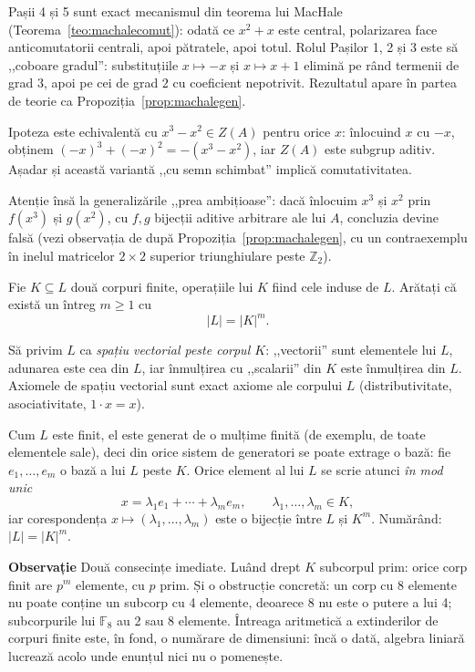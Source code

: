 \begin{obs}
Pașii 4 și 5 sunt exact mecanismul din teorema lui MacHale
(Teorema~\ref{teo:machalecomut}): odată ce $x^{2}+x$ este central,
polarizarea face anticomutatorii centrali, apoi pătratele, apoi
totul. Rolul Pașilor 1, 2 și 3 este să ,,coboare gradul'': substituțiile
$x\mapsto -x$ și $x\mapsto x+1$ elimină pe rând termenii de grad $3$,
apoi pe cei de grad $2$ cu coeficient nepotrivit. Rezultatul apare în
partea de teorie ca Propoziția~\ref{prop:machalegen}.

Ipoteza este echivalentă cu $x^{3}-x^{2}\in Z(A)$ pentru orice $x$:
înlocuind $x$ cu $-x$, obținem $(-x)^{3}+(-x)^{2}=-(x^{3}-x^{2})$, iar
$Z(A)$ este subgrup aditiv. Așadar și această variantă ,,cu semn
schimbat'' implică comutativitatea.

Atenție însă la generalizările ,,prea ambițioase'': dacă înlocuim
$x^{3}$ și $x^{2}$ prin $f(x^{3})$ și $g(x^{2})$, cu $f,g$ bijecții
aditive arbitrare ale lui $A$, concluzia devine falsă (vezi
observația de după Propoziția~\ref{prop:machalegen}, cu un
contraexemplu în inelul matricelor $2\times 2$ superior triunghiulare
peste $\mathbb{Z}_{2}$).
\end{obs}


\begin{problema}[Clasică]
Fie $K \subseteq L$ două corpuri finite, operațiile lui $K$ fiind cele induse de $L$. Arătați că există un întreg $m \geq 1$ cu
\[
  |L| = |K|^m.
\]
\end{problema}

\begin{solutie}
Să privim $L$ ca \emph{spațiu vectorial peste corpul $K$}: ,,vectorii'' sunt elementele lui $L$, adunarea este cea din $L$, iar înmulțirea cu ,,scalarii'' din $K$ este înmulțirea din $L$. Axiomele de spațiu vectorial sunt exact axiome ale corpului $L$ (distributivitate, asociativitate, $1 \cdot x = x$).

Cum $L$ este finit, el este generat de o mulțime finită (de exemplu, de toate elementele sale), deci din orice sistem de generatori se poate extrage o bază: fie $e_1, \dots, e_m$ o bază a lui $L$ peste $K$. Orice element al lui $L$ se scrie atunci \emph{în mod unic}
\[
  x = \lambda_1 e_1 + \cdots + \lambda_m e_m, \qquad \lambda_1, \dots, \lambda_m \in K,
\]
iar corespondența $x \mapsto (\lambda_1, \dots, \lambda_m)$ este o bijecție între $L$ și $K^m$. Numărând: $|L| = |K|^m$.

\medskip
\noindent\textbf{Observație} \quad Două consecințe imediate. Luând drept $K$ subcorpul prim: orice corp finit are $p^m$ elemente, cu $p$ prim. Și o obstrucție concretă: un corp cu 8 elemente nu poate conține un subcorp cu 4 elemente, deoarece 8 nu este o putere a lui 4; subcorpurile lui $\mathbb{F}_8$ au 2 sau 8 elemente. Întreaga aritmetică a extinderilor de corpuri finite este, în fond, o numărare de dimensiuni: încă o dată, algebra liniară lucrează acolo unde enunțul nici nu o pomenește.
\end{solutie}

